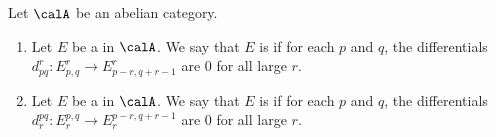\begin{definition} \label{definition:regular_spectral_sequence_in_an_abelian_category}
    Let $\calA$ be an abelian category. 
    \begin{enumerate}
        \item Let $E$ be a  in $\calA$. We say that $E$ is  if for each $p$ and $q$, the differentials $d_{pq}^r: E_{p,q}^r \to E_{p-r, q+r-1}^r$ are $0$ for all large $r$.  
 
        \item Let $E$ be a  in $\calA$. We say that $E$ is  if for each $p$ and $q$, the differentials $d^{pq}_r: E^{p,q}_r \to E^{p-r, q+r-1}_r$ are $0$ for all large $r$.  
    \end{enumerate}
\end{definition}